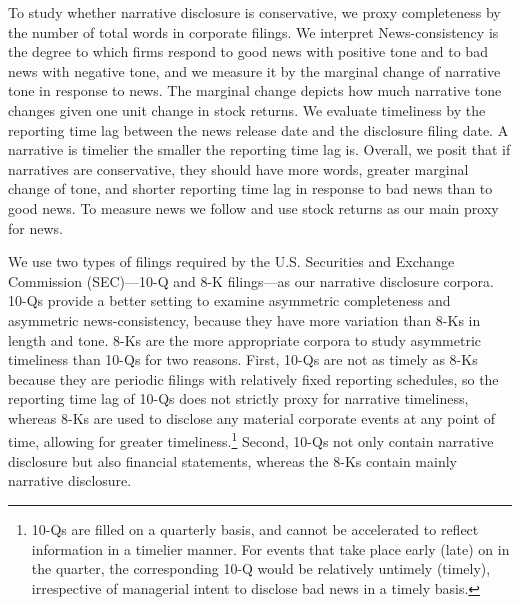 \documentclass[letterpaper,12pt]{article}
\begin{document}
\begin{spacing}{1.5}
To study whether narrative disclosure is conservative, we proxy completeness by the number of total words in corporate filings. We interpret News-consistency is the degree to which firms respond to good news with positive tone and to bad news with negative tone, and we measure it by the marginal change of narrative tone in response to news. The marginal change depicts how much narrative tone changes given one unit change in stock returns. 
We evaluate timeliness by the reporting time lag between the news release date and the disclosure filing date.  A narrative is timelier the smaller the reporting time lag is. Overall, we posit that if narratives are conservative, they should have more words, greater marginal change of tone, and shorter reporting time lag in response to bad news than to good news. To measure news we follow  and use stock returns as our main proxy for news.

We use two types of filings required by the U.S. Securities and Exchange Commission (SEC)---10-Q and 8-K filings---as our narrative disclosure corpora. 10-Qs provide a better setting to examine asymmetric completeness and asymmetric news-consistency, because they have more variation than 8-Ks in length and tone. 8-Ks are the more appropriate corpora to study asymmetric timeliness than 10-Qs for two reasons. First, 10-Qs are not as timely as 8-Ks because they are periodic filings with relatively fixed reporting schedules, so the reporting time lag of 10-Qs does not strictly proxy for narrative timeliness, whereas 8-Ks are used to disclose any material corporate events at any point of time, allowing for greater timeliness.\footnote{10-Qs are filled on a quarterly basis, and cannot be accelerated to reflect information in a timelier manner. For events that take place early (late) on in the quarter, the corresponding 10-Q would be relatively untimely (timely), irrespective of managerial intent to disclose bad news in a timely basis.}  Second, 10-Qs not only contain narrative disclosure but also financial statements,  whereas the 8-Ks contain mainly narrative disclosure.


\end{spacing}
\end{document}
